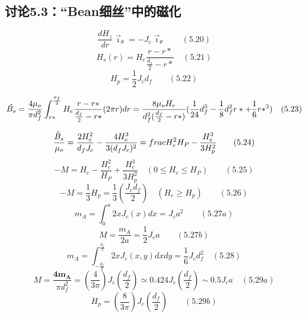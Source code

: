 \subsection{讨论5.3：“Bean细丝”中的磁化}

\begin{equation}%
\frac{dH_{z}}{dr}\vec{\imath}_{\theta}=-J_{c}\vec{\imath}_{\theta}\qquad(5.20)
\end{equation}
\begin{equation}%
H_{s}(r)=H_{e}\frac{r-r*}{\frac{d_{f}}{2}-r*}\quad(5.21)
\end{equation}
\begin{equation}%
H_{p}=\frac{1}{2}J_{c}d_{f}\qquad(5.22)
\end{equation}




\begin{equation}%
\tilde{B_{s}}=\frac{4\mu_{o}}{\pi d_{f}^{2}}\int_{r*}^{\frac{d_{f}}{2}}H_{e}\frac{r-r*}{\frac{d_{f}}{2}-r*}(2\pi r)dr\\
=\frac{8\mu_{o}H_{e}}{d_{f}^{2}(\frac{d_{f}}{2}-r*)}(\frac{1}{24}d_{f}^{3}-\frac{1}{8}d_{f}^{2}r*+\frac{1}{6}r*^{3})\quad(5.23)
\end{equation}


\begin{equation}%
\frac{\tilde{B}_{s}}{\mu_{o}}=\frac{2H^{2}_{e}}{d_{f}J_{c}}-\frac{4H^{3}_{e}}{3(d_{f}J_{c})^{2}}=\\frac{H^{2}_{e}}{H_{P}}-\frac{H_{e}^{3}}{3H^{2}_{p}}\qquad(5.24)
\end{equation}
\begin{equation}%
-M=H_{e}-\frac{H^{2}_{e}}{H_{P}}+\frac{H^{3}_{e}}{3H^{2}_{p}}\quad(0\leq H_{e}\leq H_{P})\qquad(5.25)
\end{equation}
\begin{equation}%
-M=\frac{1}{3}H_{p}=\frac{1}{3}(\frac{J_{c}d_{f}}{2})\quad(H_{e}\geq H_{p})\qquad(5.26)
\end{equation}
\begin{equation}%
m_{A}=\int_{0}^{a}2xJ_{c}(x)dx=J_{c}a^{2}\qquad(5.27a)
\end{equation}
\begin{equation}%
M=\frac{m_{A}}{2a}=\frac{1}{2}J_{c}a\qquad(5.27b)
\end{equation}
\begin{equation}%
m_{A}=\int_{-\frac{d_{f}}{2}}^{\frac{d_{f}}{2}}2xJ_{c}(x,y)dxdy=\frac{1}{6}J_{c}d_{f}^{2}\quad(5.28)
\end{equation}
\begin{equation}%
M=\frac{\mathbf{4m_{A}}}{\pi d_{f}^{2}}=(\frac{4}{3\pi})J_{c}(\frac{d_{f}}{2})\simeq0.424J_{c}(\frac{d_{f}}{2})\sim0.5J_{c}a\quad(5.29a)
\end{equation}
\begin{equation}%
H_{p}=(\frac{8}{3\pi})J_{c}(\frac{d_{f}}{2})\qquad(5.29b)
\end{equation}


